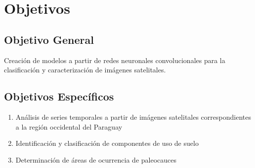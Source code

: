 \section{Objetivos}

\subsection{Objetivo General}

Creación de modelos a partir de redes neuronales convolucionales para la clasificación y caracterización de imágenes satelitales.

\subsection{Objetivos Específicos}

\begin{enumerate}
    \item Análisis de series temporales a partir de imágenes satelitales correspondientes a la región occidental del Paraguay
    \item Identificación y clasificación de componentes de uso de suelo
    \item Determinación de áreas de ocurrencia de paleocauces
\end{enumerate}
